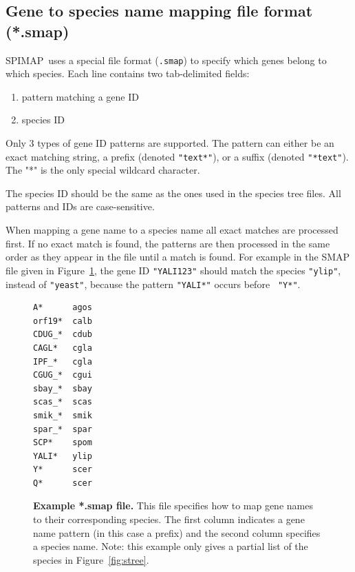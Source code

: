 \documentclass[11pt]{article}
\newcommand{\figref}[1]{Figure~\ref{#1}}
\newcommand{\spimap}{{\sf\scshape SPIMAP}}
\begin{document}
\subsection{Gene to species name mapping file format (*.smap)}
\label{sec:file:smap}

\spimap\ uses a special file format ({\tt *.smap}) to specify which
genes belong to which species. Each line contains two tab-delimited
fields: 
\begin{enumerate}[itemsep=0pt,topsep=0pt]
\item pattern matching a gene ID
\item species ID
\end{enumerate}

Only 3 types of gene ID patterns are supported.  The pattern can
either be an exact matching string, a prefix (denoted {\tt "text*"}),
or a suffix (denoted {\tt "*text"}).  The "*" is the only special
wildcard character.

The species ID should be the same as the ones used in the species tree
files.  All patterns and IDs are case-sensitive.

When mapping a gene name to a species name all exact matches are
processed first.  If no exact match is found, the patterns are then
processed in the same order as they appear in the file until a match
is found. For example in the SMAP file given in \figref{fig:smap}, the
gene ID {\tt "YALI123"} should match the species {\tt "ylip"}, instead of
{\tt"yeast"}, because the pattern {\tt "YALI*"} occurs before {\tt
"Y*"}.


\begin{figure}
\begin{center}
\begin{lstlisting}[frame=tblr]
A*      agos
orf19*  calb
CDUG_*  cdub
CAGL*   cgla
IPF_*   cgla
CGUG_*  cgui
sbay_*  sbay
scas_*  scas
smik_*  smik
spar_*  spar
SCP*    spom
YALI*   ylip
Y*      scer
Q*      scer
\end{lstlisting}
\end{center}

\caption{{\bf Example *.smap file.} This file specifies how to map
gene names to their corresponding species.  The first column indicates
a gene name pattern (in this case a prefix) and the second column specifies 
a species name.  Note: this example only gives a partial list of the species 
in \figref{fig:stree}. }
\label{fig:smap}
\end{figure}
\end{document}
